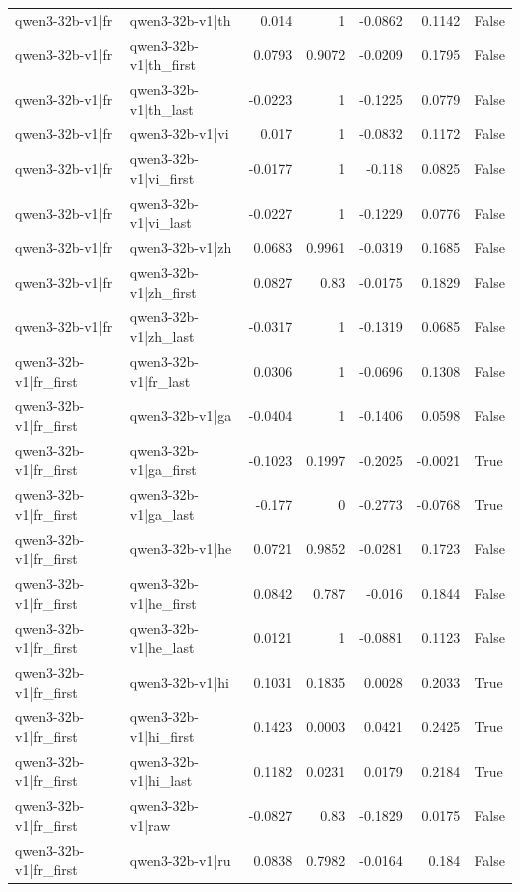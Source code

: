 \begin{table}
\begin{tabular}{l l r r r r l}
qwen3-32b-v1|fr & qwen3-32b-v1|th & 0.014 & 1 & -0.0862 & 0.1142 & False \\
qwen3-32b-v1|fr & qwen3-32b-v1|th_first & 0.0793 & 0.9072 & -0.0209 & 0.1795 & False \\
qwen3-32b-v1|fr & qwen3-32b-v1|th_last & -0.0223 & 1 & -0.1225 & 0.0779 & False \\
qwen3-32b-v1|fr & qwen3-32b-v1|vi & 0.017 & 1 & -0.0832 & 0.1172 & False \\
qwen3-32b-v1|fr & qwen3-32b-v1|vi_first & -0.0177 & 1 & -0.118 & 0.0825 & False \\
qwen3-32b-v1|fr & qwen3-32b-v1|vi_last & -0.0227 & 1 & -0.1229 & 0.0776 & False \\
qwen3-32b-v1|fr & qwen3-32b-v1|zh & 0.0683 & 0.9961 & -0.0319 & 0.1685 & False \\
qwen3-32b-v1|fr & qwen3-32b-v1|zh_first & 0.0827 & 0.83 & -0.0175 & 0.1829 & False \\
qwen3-32b-v1|fr & qwen3-32b-v1|zh_last & -0.0317 & 1 & -0.1319 & 0.0685 & False \\
qwen3-32b-v1|fr_first & qwen3-32b-v1|fr_last & 0.0306 & 1 & -0.0696 & 0.1308 & False \\
qwen3-32b-v1|fr_first & qwen3-32b-v1|ga & -0.0404 & 1 & -0.1406 & 0.0598 & False \\
qwen3-32b-v1|fr_first & qwen3-32b-v1|ga_first & -0.1023 & 0.1997 & -0.2025 & -0.0021 & True \\
qwen3-32b-v1|fr_first & qwen3-32b-v1|ga_last & -0.177 & 0 & -0.2773 & -0.0768 & True \\
qwen3-32b-v1|fr_first & qwen3-32b-v1|he & 0.0721 & 0.9852 & -0.0281 & 0.1723 & False \\
qwen3-32b-v1|fr_first & qwen3-32b-v1|he_first & 0.0842 & 0.787 & -0.016 & 0.1844 & False \\
qwen3-32b-v1|fr_first & qwen3-32b-v1|he_last & 0.0121 & 1 & -0.0881 & 0.1123 & False \\
qwen3-32b-v1|fr_first & qwen3-32b-v1|hi & 0.1031 & 0.1835 & 0.0028 & 0.2033 & True \\
qwen3-32b-v1|fr_first & qwen3-32b-v1|hi_first & 0.1423 & 0.0003 & 0.0421 & 0.2425 & True \\
qwen3-32b-v1|fr_first & qwen3-32b-v1|hi_last & 0.1182 & 0.0231 & 0.0179 & 0.2184 & True \\
qwen3-32b-v1|fr_first & qwen3-32b-v1|raw & -0.0827 & 0.83 & -0.1829 & 0.0175 & False \\
qwen3-32b-v1|fr_first & qwen3-32b-v1|ru & 0.0838 & 0.7982 & -0.0164 & 0.184 & False \\

\end{tabular}
\end{table}
